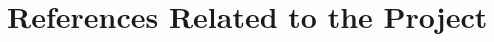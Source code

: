 \documentclass[a4paper,11pt]{article}
\begin{document}
{}

\section[References Related to the Project]{References Related to the Project}
\vspace*{-1cm}
 
 \small
 
 
%
\end{document}
